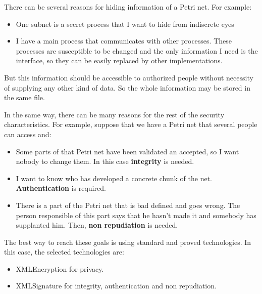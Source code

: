 There can be several reasons for hiding information of a Petri net. For example:

\begin{itemize}
\item One subnet is a secret process that I want to hide from indiscrete
eyes
\item I have a main process that communicates with other processes. These
processes are susceptible to be changed and the only information I need is
the interface, so they can be easily replaced by other implementations.
\end{itemize}

But this information should be accessible to authorized
people without necessity of supplying any other kind of data.
So the whole information may be stored in the same file.

In the same way, there can be many reasons for the rest of the security characteristics.
For example, suppose that we have a Petri net that several people can access
and:
\begin{itemize}
\item Some parts of that Petri net have been validated an accepted, so I
want nobody to change them. In this case  \textbf{integrity} is needed.
\item I want to know who has developed a concrete chunk of the net. \textbf{Authentication}
is required.

\item There is a part of the Petri net that is bad defined and goes wrong.
The person responsible of this part says that he hasn't made it and somebody has
supplanted him. Then, \textbf{non repudiation} is needed.
\end{itemize}



The best way to reach these goals is using standard and proved
technologies. In this case, the selected technologies are: 
\begin{itemize}
\item XMLEncryption\cite{XMLENC-w3.org/xmlenc-core1} for privacy.
\item XMLSignature \cite{XMLSIG-w3.org/xmlsig-core1} for integrity, authentication and non repudiation.
\end{itemize}




